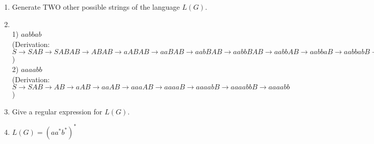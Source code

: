 \documentclass[a4paper, 12pt]{article}
\makeatletter
\renewenvironment{proof}[1][\proofname]{\par
  \normalfont \topsep6\p@\@plus6\p@\relax
  \trivlist
  \item[\hskip\labelsep
        \itshape
    #1\@addpunct{.}]\ignorespaces
}{%
  \endtrivlist\@endpefalse
}
\renewcommand{\proofname}{Solution:}
\makeatother
\begin{document}
\begin{enumerate}
\begin{enumerate}
            \item Generate TWO other possible strings of the language $L(G)$.
            \begin{proof}
            \hfill \\
                1) $aabbab$ \\
                (Derivation: $S \to SAB \to SABAB \to ABAB \to aABAB \to aaBAB \to aabBAB \to aabbBAB \to aabbAB \to aabbaB \to aabbabB \to aabbab$) \\
                
                2) $aaaabb$ \\
                (Derivation: $S \to SAB \to AB \to aAB \to aaAB \to aaaAB \to aaaaB \to aaaabB \to aaaabbB \to aaaabb$)
            \end{proof}
            
            \item Give a regular expression for $L(G)$.
            \begin{proof}
                $L(G)=(aa^*b^*)^*$
            \end{proof}
        \end{enumerate}


\end{enumerate}
\end{document}
